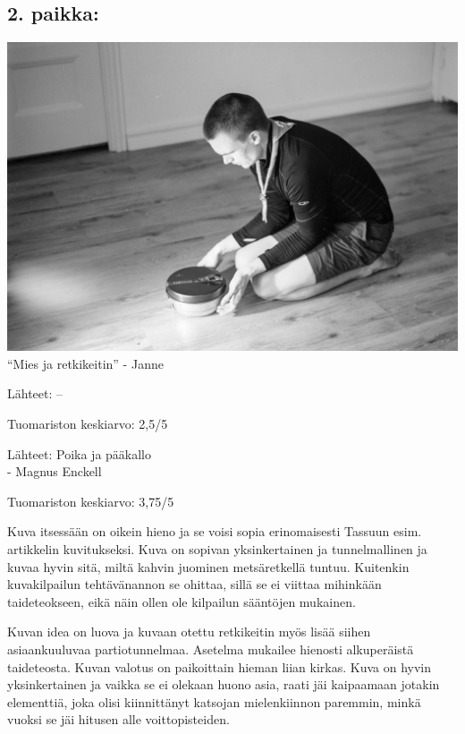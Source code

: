 \begin{multicols}{2}
	\subsection*{2. paikka:}
	\vspace*{0.54cm}
\begin{center}
	\noindent\includegraphics[width=0.99\linewidth]{assets/kuvakilpailu2}\\
	``Mies ja retkikeitin'' - Janne%
	\vspace*{0.54cm}
\end{center}

\end{multicols}

\begin{multicols}{2}

	\noindent Lähteet: \quad --

	\noindent Tuomariston keskiarvo: 2,5/5

	\columnbreak

	\noindent Lähteet: Poika ja pääkallo\\ \hfill - Magnus Enckell

	\noindent Tuomariston keskiarvo: 3,75/5

\end{multicols}

\begin{multicols}{2}

\noindent Kuva itsessään on oikein hieno ja se voisi sopia erinomaisesti Tassuun esim.
artikkelin kuvitukseksi. Kuva on sopivan yksinkertainen ja tunnelmallinen ja
kuvaa hyvin sitä, miltä kahvin juominen metsäretkellä tuntuu. Kuitenkin
kuvakilpailun tehtävänannon se ohittaa, sillä se ei viittaa mihinkään
taideteokseen, eikä näin ollen ole kilpailun sääntöjen mukainen.

	\columnbreak

\noindent Kuvan idea on luova ja kuvaan otettu retkikeitin myös lisää siihen
asiaankuuluvaa partiotunnelmaa. Asetelma mukailee hienosti alkuperäistä
taideteosta. Kuvan valotus on paikoittain hieman liian kirkas. Kuva on hyvin
yksinkertainen ja vaikka se ei olekaan huono asia, raati jäi kaipaamaan jotakin
elementtiä, joka olisi kiinnittänyt katsojan mielenkiinnon paremmin, minkä
vuoksi se jäi hitusen alle voittopisteiden.

\end{multicols}


